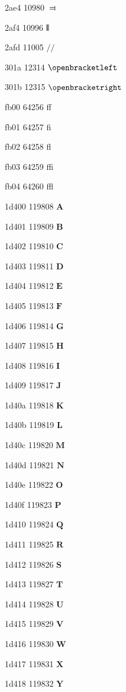 \documentclass[11pt]{article}
\begin{document}
2ae4 10980 \ensuremath{\Dashv}

2af4 10996 \ensuremath{\interleave}

2afd 11005 \ensuremath{{/}\!\!{/}}

301a 12314 \ensuremath{\openbracketleft}

301b 12315 \ensuremath{\openbracketright}

fb00 64256 ff

fb01 64257 fi

fb02 64258 fl

fb03 64259 ffi

fb04 64260 ffl

1d400 119808 \ensuremath{\mathbf{A}}

1d401 119809 \ensuremath{\mathbf{B}}

1d402 119810 \ensuremath{\mathbf{C}}

1d403 119811 \ensuremath{\mathbf{D}}

1d404 119812 \ensuremath{\mathbf{E}}

1d405 119813 \ensuremath{\mathbf{F}}

1d406 119814 \ensuremath{\mathbf{G}}

1d407 119815 \ensuremath{\mathbf{H}}

1d408 119816 \ensuremath{\mathbf{I}}

1d409 119817 \ensuremath{\mathbf{J}}

1d40a 119818 \ensuremath{\mathbf{K}}

1d40b 119819 \ensuremath{\mathbf{L}}

1d40c 119820 \ensuremath{\mathbf{M}}

1d40d 119821 \ensuremath{\mathbf{N}}

1d40e 119822 \ensuremath{\mathbf{O}}

1d40f 119823 \ensuremath{\mathbf{P}}

1d410 119824 \ensuremath{\mathbf{Q}}

1d411 119825 \ensuremath{\mathbf{R}}

1d412 119826 \ensuremath{\mathbf{S}}

1d413 119827 \ensuremath{\mathbf{T}}

1d414 119828 \ensuremath{\mathbf{U}}

1d415 119829 \ensuremath{\mathbf{V}}

1d416 119830 \ensuremath{\mathbf{W}}

1d417 119831 \ensuremath{\mathbf{X}}

1d418 119832 \ensuremath{\mathbf{Y}}
\end{document}
